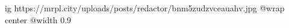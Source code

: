  
 
 
 
 

\ifcmt
  ig https://mrpl.city/uploads/posts/redactor/bnm5zudzvceauahv.jpg
  @wrap center
  @width 0.9
\fi
